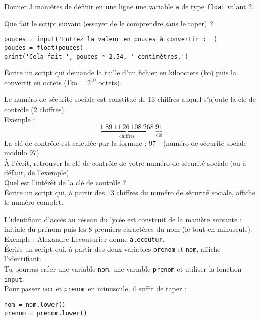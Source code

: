 \begin{exercice}
    Donner 3 manières de définir en une ligne une variable \texttt{a} de type \texttt{float} valant 2.
\end{exercice}

\begin{exercice}
    Que fait le script suivant (essayer de le comprendre sans le taper) ?
\begin{verbatim}
pouces = input('Entrez la valeur en pouces à convertir : ')
pouces = float(pouces)
print('Cela fait ', pouces * 2.54, ' centimètres.')
\end{verbatim}

    \'Ecrire un script qui demande la taille d'un fichier en kilooctets (ko) puis la convertit en octets (1ko = $2^{10}$ octets).
\end{exercice}
\begin{exercice}
    Le numéro de sécurité sociale est constitué de 13 chiffres auquel s'ajoute la clé de contrôle (2 chiffres).\\
    Exemple : $$\underbrace{1\ 89\ 11\ 26\ 108\ 268}_{\textrm{chiffres}}\ \underbrace{91}_{\textrm{clé}}$$
    La clé de contrôle est calculée par la formule : 97 - (numéro de sécurité sociale modulo 97).\\
    À l'écrit, retrouver la clé de contrôle de votre numéro de sécurité sociale (ou à défaut, de l'exemple).\\
    Quel est l'intérêt de la clé de contrôle ?\\
    \'Ecrire un script qui, à partir des 13 chiffres du numéro de sécurité sociale, affiche le numéro complet.
\end{exercice}
\begin{exercice}
    L'identifiant d'accès au réseau du lycée est construit de la manière suivante : initiale du prénom puis les 8 premiers caractères du nom (le tout en minuscule).\\
    Exemple : Alexandre Lecouturier donne \texttt{alecoutur}.\\
    \'Ecrire un script qui, à partir des deux variables \texttt{prenom} et \texttt{nom}, affiche l'identifiant.\\
    Tu pourras créer une variable \texttt{nom}, une variable \texttt{prenom} et utiliser la fonction \texttt{input}.\\
    Pour passer \texttt{nom} et \texttt{prenom} en minuscule, il suffit de taper :
    \begin{verbatim}
nom = nom.lower()
prenom = prenom.lower()
\end{verbatim}
\end{exercice}

